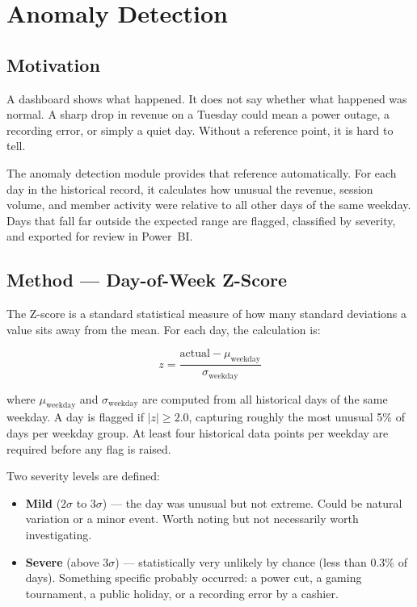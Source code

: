 \section{Anomaly Detection}

\subsection{Motivation}

A dashboard shows what happened. It does not say whether what happened was normal.
A sharp drop in revenue on a Tuesday could mean a power outage, a recording error, or
simply a quiet day. Without a reference point, it is hard to tell.

The anomaly detection module provides that reference automatically. For each day in
the historical record, it calculates how unusual the revenue, session volume, and
member activity were relative to all other days of the same weekday. Days that fall
far outside the expected range are flagged, classified by severity, and exported for
review in Power~BI.

\subsection{Method --- Day-of-Week Z-Score}

The Z-score is a standard statistical measure of how many standard deviations a value
sits away from the mean. For each day, the calculation is:

\[
  z = \frac{\text{actual} - \mu_{\text{weekday}}}{\sigma_{\text{weekday}}}
\]

where $\mu_{\text{weekday}}$ and $\sigma_{\text{weekday}}$ are computed from all
historical days of the same weekday. A day is flagged if $|z| \geq 2.0$, capturing
roughly the most unusual 5\% of days per weekday group. At least four historical
data points per weekday are required before any flag is raised.

Two severity levels are defined:

\begin{itemize}
  \item \textbf{Mild} ($2\sigma$ to $3\sigma$) --- the day was unusual but not
        extreme. Could be natural variation or a minor event. Worth noting but not
        necessarily worth investigating.
  \item \textbf{Severe} (above $3\sigma$) --- statistically very unlikely by chance
        (less than 0.3\% of days). Something specific probably occurred: a power
        cut, a gaming tournament, a public holiday, or a recording error by a cashier.
\end{itemize}

